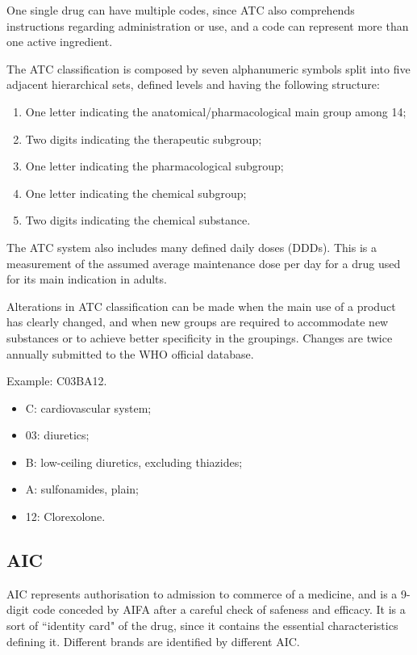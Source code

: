 One single drug can have multiple codes, since ATC also comprehends instructions regarding administration or use, and a code can represent more than one active ingredient.

The ATC classification is composed by seven alphanumeric symbols split into five adjacent hierarchical sets, defined levels and having the following structure\cite{atclevels}:
\begin{enumerate}
	\item One letter indicating the anatomical/pharmacological main group among 14;
	\item Two digits indicating the therapeutic subgroup;
	\item One letter indicating the pharmacological subgroup;
	\item One letter indicating the chemical subgroup;
	\item Two digits indicating the chemical substance.
\end{enumerate}

The ATC system also includes many defined daily doses (DDDs). This is a measurement of the assumed average maintenance dose per day for a drug used for its main indication in adults.

Alterations in ATC classification can be made when the main use of a product has clearly changed, and when new groups are required to accommodate new substances or to achieve better specificity in the groupings. Changes are twice annually submitted to the WHO official database.

Example: C03BA12.
\begin{itemize}
	\item C: cardiovascular system;
		\item 03: diuretics;
			\item B: low-ceiling diuretics, excluding thiazides;
				\item A: sulfonamides, plain;
					\item 12: Clorexolone.
\end{itemize}

\subsection{AIC}
AIC represents authorisation to admission to commerce of a medicine, and is a 9-digit code conceded by AIFA after a careful check of safeness and efficacy. It is a sort of ``identity card" of the drug, since it contains the essential characteristics defining it\cite{aicdef}. Different brands are identified by different AIC.

